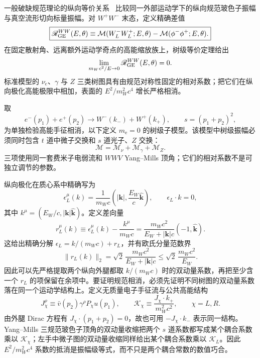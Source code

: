 一般破缺规范理论的纵向等价关系~ 比较同一外部运动学下的纵向规范玻色子振幅与真空流形切向标量振幅。对 $W^+W^-$ 末态，定义精确差值
\begin{equation}
\boxed{
\mathscr R_{\rm GE}^{WW}(E,\theta)
\equiv
\mathcal M(W_L^-W_L^+;E,\theta)
-\mathcal M(\phi^-\phi^+;E,\theta).}
\label{eq:eeww-equivalence-dp11}
\end{equation}
在固定散射角、远离额外运动学奇点的高能缩放族上，树级等价定理给出
\begin{equation*}
 \lim_{m_Wc^2/E\to0}\mathscr R_{\rm GE}^{WW}(E,\theta)=0.
\end{equation*}
标准模型的 $\nu_e$、$\gamma$ 与 $Z$ 三类树图具有由规范对称性固定的相对系数；把它们在纵向极化高能极限中相加，表面的 $E^2/m_W^2c^4$ 增长严格相消。

取
\begin{equation*}
e^-(p_1)+e^+(p_2)\to W^-(k_-)+W^+(k_+),
\qquad s=(p_1+p_2)^2,
\end{equation*}
为单独检验高能手征相消，以下定义 $m_{\mathrm e}=0$ 的树级子模型。该模型中树级振幅必须同时包含 $t$ 道中微子交换和 $s$ 道光子、$Z$ 交换：
\begin{equation}
\mathcal M=\mathcal M_\nu+\mathcal M_\gamma+\mathcal M_Z.
\label{eq:eeww-three-amplitudes-dp11}
\end{equation}
三项使用同一套费米子电弱流和 $WWV$ Yang--Mills 顶角；它们的相对系数不是可独立调节的参数。

纵向极化在质心系中精确写为
\begin{equation*}
\epsilon_L^\mu(k)
=\frac1{m_Wc}\left(|\mathbf k|,\frac{E_W}{c}\widehat{\mathbf k}\right),
\qquad \epsilon_L\cdot k=0,
\end{equation*}
其中 $k^\mu=(E_W/c,|\mathbf k|\widehat{\mathbf k})$。定义差向量
\begin{equation}
\boxed{
 r_L^\mu(k)
 \equiv\epsilon_L^\mu(k)-\frac{k^\mu}{m_Wc}
 =\frac{m_Wc^2}{E_W+|\mathbf k|c}
 \left(-1,\widehat{\mathbf k}\right).}
\label{eq:longitudinal-polarization-highE-dp11}
\end{equation}
这给出精确分解 $\epsilon_L=k/(m_Wc)+r_L$，并有欧氏分量范数界
\begin{equation*}
 \|r_L(k)\|_2
 =\sqrt2\,\frac{m_Wc^2}{E_W+|\mathbf k|c}
 \le\sqrt2\,\frac{m_Wc^2}{E_W}.
\end{equation*}
因此可以先严格提取两个纵向外腿都取 $k/(m_Wc)$ 时的双动量系数，再把至少含一个 $r_L$ 的项保留在余项中。要证明规范相消，必须先证明不同树图的双动量系数落在同一个运动学结构上。定义无质量电子手征流与公共高能结构
\begin{equation}
\boxed{
J_\chi^\rho\equiv\bar v(p_2)\gamma^\rho P_\chi u(p_1),
\qquad
\mathcal K_\chi\equiv
\frac{J_\chi\!\cdot k_+}{m_W^2c^2},
\qquad \chi=L,R.}
\label{eq:eeww-common-kinematic-structure-dp75}
\end{equation}
由外腿 Dirac 方程有 $J_\chi\!\cdot(p_1+p_2)=0$，故也可用 $-J_\chi\!\cdot k_-$ 表示同一结构。Yang--Mills 三规范玻色子顶角的双动量收缩把两个 $s$ 道系数都写成某个耦合系数乘以 $\mathcal K_\chi$；左手中微子图的双动量收缩同样给出某个耦合系数乘以 $\mathcal K_L$。因此 $E^2/m_W^2c^4$ 系数的抵消是振幅级等式，而不只是两个耦合常数的数值巧合。

